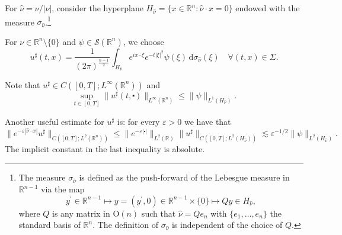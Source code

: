 \documentclass[10pt,a4paper]{amsart}
\newcommand{\R}{\mathbb{R}}
\newcommand{\dd}{\mathrm{d}}
\newcommand{\Orth}{\mathrm{O}}
\begin{document}
For $\hat{\nu} = \nu / |\nu|$, consider the hyperplane
$ H_{\hat{\nu}} = \{ x \in \R^n : \hat{\nu} \cdot x = 0 \} $
endowed with the measure $\sigma_{\hat{\nu}}$.\footnote{The measure $\sigma_{\hat{\nu}}$ is
defined as the push-forward of the 
Lebesgue measure in $\R^{n-1}$ via the map
\[ y^\prime \in \R^{n-1} \longmapsto y=(y^\prime, 0) \in \R^{n-1} \times \{ 0 \} \longmapsto Q y \in H_{\hat{\nu}}, \]
where $Q$ is any matrix in $\Orth(n)$ such that $\hat{\nu} = Q e_n$
with $\{ e_1, \dots , e_n \}$ the standard basis of $\R^n$. The definition of 
$\sigma_{\hat{\nu}}$ is independent of the choice of $Q$.}

For $\nu \in \R^n \setminus \{0\}$ and $\psi \in \mathcal{S} (\R^n)$, we choose
\begin{equation}
\label{id:ushrap}
u^\sharp (t, x) = \frac{1}{(2\pi)^\frac{n-1}{2}} \int_{H_{\hat{\nu}}} e^{ix \cdot \xi} e^{- t |\xi|^2} {\psi}(\xi) \, \dd \sigma_{\hat{\nu}} (\xi) \quad \forall (t, x) \in \Sigma.
\end{equation}

Note that $u^\sharp \in C([0,T]; L^\infty(\R^n))$ and
\[\sup_{t \in [0, T]} \| u^\sharp (t, \centerdot) \|_{L^\infty(\R^n)} \leq \| \psi \|_{L^1(H_{\hat \nu})}.\]

Another useful estimate for $u^\sharp$ is: for every 
$\varepsilon > 0$ we have that
\begin{equation}\label{in:usharp_full-space}
\| e^{-\varepsilon |\hat \nu \cdot x|} u^\sharp \|_{C([0, T]; L^2(\R^n))} \leq \| e^{-\varepsilon |\centerdot|} \|_{L^2(\R)} \| u^\sharp \|_{C([0, T]; L^2(H_{\hat \nu}))} \lesssim \varepsilon^{-1/2} \| \psi \|_{L^2(H_{\hat \nu})}.
\end{equation}
The implicit constant in the last inequality is absolute.
\end{document}
